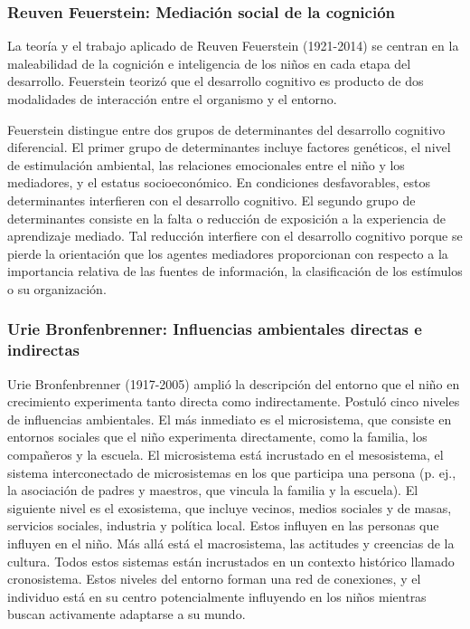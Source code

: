 \documentclass[11pt,letterpaper]{report}
\begin{document}
\subsubsection{Reuven Feuerstein: Mediación social de la cognición}
La teoría y el trabajo aplicado de Reuven Feuerstein (1921-2014) se centran en
la maleabilidad de la cognición e inteligencia de los niños en cada etapa del
desarrollo. Feuerstein teorizó que el desarrollo cognitivo es producto de dos
modalidades de interacción entre el organismo y el entorno. \cite{Feldman3}

Feuerstein distingue entre dos grupos de determinantes del desarrollo cognitivo
diferencial. El primer grupo de determinantes incluye factores genéticos, el
nivel de estimulación ambiental, las relaciones emocionales entre el niño y los
mediadores, y el estatus socioeconómico. En condiciones desfavorables, estos
determinantes interfieren con el desarrollo cognitivo. El segundo grupo de
determinantes consiste en la falta o reducción de exposición a la experiencia
de aprendizaje mediado. Tal reducción interfiere con el desarrollo cognitivo
porque se pierde la orientación que los agentes mediadores proporcionan con
respecto a la importancia relativa de las fuentes de información, la
clasificación de los estímulos o su organización. \cite{Feldman3}

\subsubsection{Urie Bronfenbrenner: Influencias ambientales directas e indirectas}
Urie Bronfenbrenner (1917-2005) amplió la descripción del entorno que el niño
en crecimiento experimenta tanto directa como indirectamente. Postuló cinco
niveles de influencias ambientales. El más inmediato es el microsistema, que
consiste en entornos sociales que el niño experimenta directamente, como la
familia, los compañeros y la escuela. El microsistema está incrustado en el
mesosistema, el sistema interconectado de microsistemas en los que participa
una persona (p. ej., la asociación de padres y maestros, que vincula la familia
y la escuela). El siguiente nivel es el exosistema, que incluye vecinos, medios
sociales y de masas, servicios sociales, industria y política local. Estos
influyen en las personas que influyen en el niño. Más allá está el
macrosistema, las actitudes y creencias de la cultura. Todos estos sistemas
están incrustados en un contexto histórico llamado cronosistema. Estos niveles
del entorno forman una red de conexiones, y el individuo está en su centro
potencialmente influyendo en los niños mientras buscan activamente adaptarse a
su mundo. \cite{Feldman3}
\end{document}
